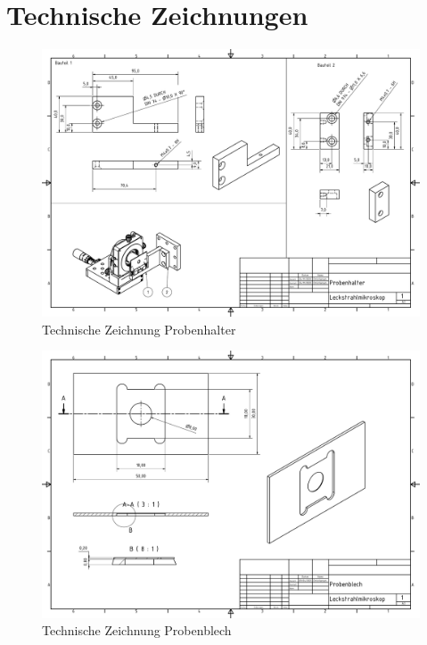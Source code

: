 \documentclass[titlepage]{article}
\begin{document}
	\section{Technische Zeichnungen}
	\begin{figure}
		\includegraphics[width=\textwidth]{figures/Technische_Zeichnung_Probenhalter.pdf}
		\caption{Technische Zeichnung Probenhalter}
		\label{fig:tz_probenhalter}
	\end{figure}
	\begin{figure}
		\includegraphics[width=\textwidth]{figures/Probenblech.pdf}
		\caption{Technische Zeichnung Probenblech}
		\label{fig:tz_probenblech}
	\end{figure}
\end{document}
